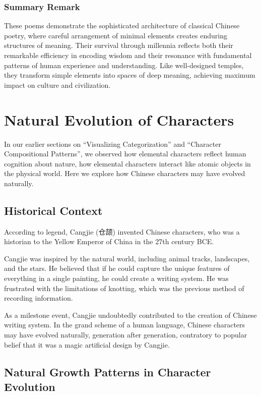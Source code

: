 \documentclass[11pt,letterpaper]{article}
\begin{document}
\subsubsection{Summary Remark}\label{summary}

These poems demonstrate the sophisticated architecture of classical
Chinese poetry, where careful arrangement of minimal elements creates
enduring structures of meaning. Their survival through millennia
reflects both their remarkable efficiency in encoding wisdom and their
resonance with fundamental patterns of human experience and
understanding. Like well-designed temples, they transform simple
elements into spaces of deep meaning, achieving maximum impact on
culture and civilization.

\section{Natural Evolution of Characters}\label{natural-evolution-of-characters}

In our earlier sections on ``Visualizing Categorization'' and
``Character Compositional Patterns'', we observed how elemental
characters reflect human cognition about nature, how elemental
characters interact like atomic objects in the physical world. Here we
explore how Chinese characters may have evolved naturally.

\subsection{Historical Context}\label{historical-context}

According to legend, Cangjie (仓颉) invented Chinese characters, who was a
historian to the Yellow Emperor of China in the 27th century BCE. 

Cangjie was inspired by the natural world, including animal tracks,
landscapes, and the stars. He believed that if he could capture the
unique features of everything in a single painting, he could create a
writing system. He was frustrated with the limitations of
knotting, which was the previous method of recording information. 

As a milestone event, Cangjie undoubtedly contributed to the creation of
Chinese writing system. In the grand scheme of a human language, Chinese
characters may have evolved naturally, generation after generation, 
contratory to popular belief that it was a magic artificial design by Cangjie.

\subsection{Natural Growth Patterns in Character
Evolution}\label{natural-growth-patterns-in-character-evolution}
\end{document}
